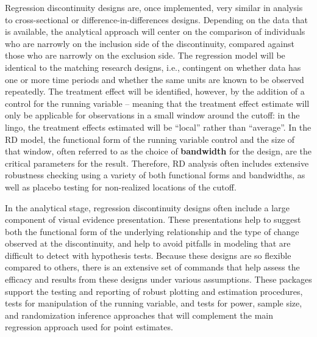Regression discontinuity designs are, once implemented,
very similar in analysis to cross-sectional or difference-in-differences designs.
Depending on the data that is available,
the analytical approach will center on the comparison of individuals
who are narrowly on the inclusion side of the discontinuity,
compared against those who are narrowly on the exclusion side.
The regression model will be identical to the matching research designs,
i.e., contingent on whether data has one or more time periods
and whether the same units are known to be observed repeatedly.
The treatment effect will be identified, however, by the addition of a control
for the running variable -- meaning that the treatment effect estimate
will only be applicable for observations in a small window around the cutoff:
in the lingo, the treatment effects estimated will be ``local'' rather than ``average''.
In the RD model, the functional form of the running variable control and the size of that window,
often referred to as the choice of \textbf{bandwidth} for the design,
are the critical parameters for the result.\cite{calonico2019regression}
Therefore, RD analysis often includes extensive robustness checking
using a variety of both functional forms and bandwidths,
as well as placebo testing for non-realized locations of the cutoff.

In the analytical stage, regression discontinuity designs
often include a large component of visual evidence presentation.
These presentations help to suggest both the functional form
of the underlying relationship and the type of change observed at the discontinuity,
and help to avoid pitfalls in modeling that are difficult to detect with hypothesis tests.
Because these designs are so flexible compared to others,
there is an extensive set of commands that help assess
the efficacy and results from these designs under various assumptions.
These packages support the testing and reporting
of robust plotting and estimation procedures,
tests for manipulation of the running variable,
and tests for power, sample size, and randomization inference approaches
that will complement the main regression approach used for point estimates.

